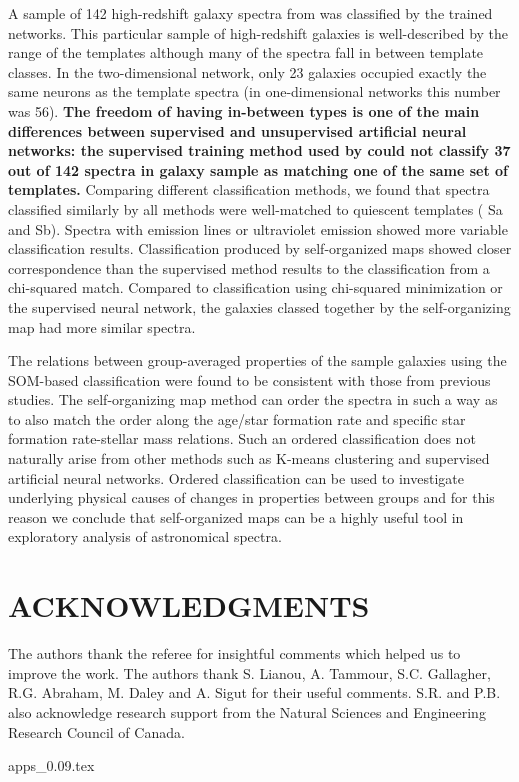 \documentclass[useAMS,usenatbib]{mn2e}
\begin{document}
    A sample of 142 high-redshift galaxy spectra from  was classified by the trained networks.
  This particular sample of high-redshift galaxies is well-described by the range of the  templates although many of the spectra fall in between template classes.
     In the two-dimensional network, only 23 galaxies occupied exactly the same neurons as the  template spectra (in one-dimensional networks this number was 56).
    {\bf The freedom of having in-between types is one of the main differences between supervised and unsupervised artificial neural networks: the supervised training method used by       could not classify 37 out of 142 spectra in galaxy sample as matching one of the same set of templates.}
    Comparing different classification methods, we found that spectra classified similarly by all methods were well-matched to quiescent templates ( Sa and Sb). Spectra with emission lines or ultraviolet emission showed more variable classification results.
    Classification produced by self-organized maps showed closer correspondence than the supervised method results to the classification from a chi-squared match.
    Compared to classification using chi-squared minimization or the supervised neural network, the galaxies classed together by the self-organizing map had more similar spectra.


The relations between group-averaged properties of the sample galaxies using the SOM-based classification were found to be consistent with those from previous studies. 
    The self-organizing map method can order the spectra in such a way as to also match the order along the age/star formation rate and specific star formation rate-stellar mass relations.
    Such an ordered classification does not naturally arise from other methods such as K-means clustering and supervised artificial neural networks.
    Ordered classification can be used to investigate underlying physical causes of changes in properties between groups and for this reason we conclude that self-organized maps can be a highly useful tool in exploratory analysis of astronomical spectra.


\section*{ACKNOWLEDGMENTS}
The authors thank the referee for insightful comments which helped us to improve the work.
The authors thank S. Lianou, A. Tammour, S.C. Gallagher, R.G. Abraham, M. Daley and A. Sigut for their useful comments. 
S.R. and P.B. also acknowledge research support from the Natural Sciences and Engineering Research Council of Canada. 




{apps_0.09.tex}
\end{document}
